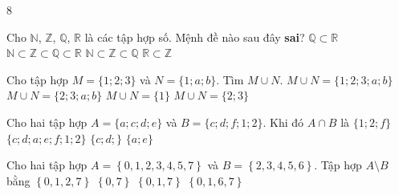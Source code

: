 \begin{indapan}{8}
\begin{ex}%
	Cho $\mathbb{N}$, $\mathbb{Z}$, $\mathbb{Q}$, $\mathbb{R}$ là các tập hợp số. Mệnh đề nào sau đây \textbf{sai}?
	\choice
	{$\mathbb{Q} \subset \mathbb{R}$}
	{$\mathbb{N} \subset \mathbb{Z} \subset \mathbb{Q} \subset \mathbb{R}$}
	{$\mathbb{N} \subset \mathbb{Z} \subset \mathbb{Q}$}
	{\True $\mathbb{R} \subset \mathbb{Z}$}
\end{ex}
\begin{ex}%
	Cho tập hợp $M=\{1;2;3\}$ và $N=\{1;a;b\}$. Tìm $M\cup N$.
	\choice
	{\True $M\cup N=\{1;2;3;a;b\}$}
	{$M\cup N=\{2;3;a;b\}$}
	{$M\cup N=\{1\}$}
	{$M\cup N=\{2;3\}$}
\end{ex}
\begin{ex}%
	Cho hai tập hợp $A=\{a;c;d;e\}$ và $B=\{c;d;f;1;2\}$. Khi đó $A\cap B$ là	
	\choice
	{$\{1;2;f\}$}
	{$\{c;d;a;e;f;1;2\}$}
	{\True $\{c;d;\}$}
	{$\{a;e\}$}
\end{ex}
\begin{ex}%
	Cho hai tập hợp $A= \left\{0, 1, 2,3,4,5,7\right\}$  và $B= \left\{2,3,4,5,6\right\}$. Tập hợp $A \setminus B$ bằng 
	\choice
	{$ \left\{0,1,2,7\right\}$}
	{$\left\{0,7\right\}$}
	{\True  $\left\{0,1,7\right\}$}
	{$\left\{0,1,6,7\right\}$}
\end{ex}


\end{indapan}
